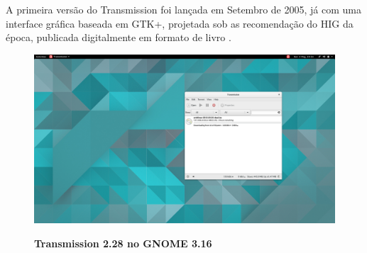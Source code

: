 A primeira versão do Transmission foi lançada em Setembro de 2005, já com uma
interface gráfica baseada em GTK+, projetada sob as recomendação do HIG
da época, publicada digitalmente em formato de livro \cite{gnome221hig}.

\begin{figure}[h!]
  \begin{center}
    \caption{\textbf{Transmission 2.28 no GNOME 3.16}}
    \includegraphics [width=\textwidth]{image/transmission/282-master/main-window.png}
    \label{transmission-master}
  \end{center}
\end{figure}
